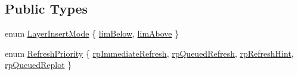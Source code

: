 \subsection*{Public Types}
\begin{DoxyCompactItemize}
\item 
enum \hyperlink{classQCustomPlot_a75a8afbe6ef333b1f3d47abb25b9add7}{Layer\+Insert\+Mode} \{ \hyperlink{classQCustomPlot_a75a8afbe6ef333b1f3d47abb25b9add7aee39cf650cd24e68552da0b697ce4a93}{lim\+Below}, 
\hyperlink{classQCustomPlot_a75a8afbe6ef333b1f3d47abb25b9add7a062b0b7825650b432a713c0df6742d41}{lim\+Above}
 \}
\item 
enum \hyperlink{classQCustomPlot_a45d61392d13042e712a956d27762aa39}{Refresh\+Priority} \{ \hyperlink{classQCustomPlot_a45d61392d13042e712a956d27762aa39aa6eda645ccf1a60635df3e8b71ea6ae2}{rp\+Immediate\+Refresh}, 
\hyperlink{classQCustomPlot_a45d61392d13042e712a956d27762aa39acd6f1e590ea775d1ddee666428077f3e}{rp\+Queued\+Refresh}, 
\hyperlink{classQCustomPlot_a45d61392d13042e712a956d27762aa39a49666a5854a68dbcca8b277b03331260}{rp\+Refresh\+Hint}, 
\hyperlink{classQCustomPlot_a45d61392d13042e712a956d27762aa39a019650c6ddf308f97e811fbfff207a8f}{rp\+Queued\+Replot}
 \}
\end{DoxyCompactItemize}
